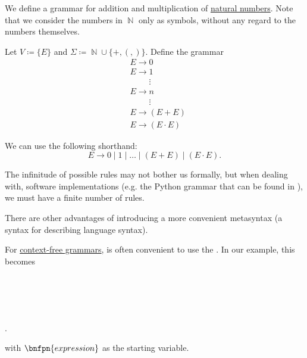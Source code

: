 \begin{example}\label{ex:natural_arithmetic_grammar/backus_naur_form}
  We define a grammar for addition and multiplication of \hyperref[def:set_of_natural_numbers]{natural numbers}. Note that we consider the numbers in \( \BbbN \) only as symbols, without any regard to the numbers themselves.

  Let \( V \coloneqq \{ E \} \) and \( \Sigma \coloneqq \BbbN \cup \{ +, (, ) \} \). Define the grammar
  \begin{equation}\label{eq:ex:natural_arithmetic_grammar/backus_naur_form/simple}
    \begin{aligned}
      &E \to 0 \\
      &E \to 1 \\
      &\phantom{E \to} \vdots \\
      &E \to n \\
      &\phantom{E \to} \vdots \\
      &E \to (E + E) \\
      &E \to (E \cdot E)
    \end{aligned}
  \end{equation}

  We can use the following shorthand:
  \begin{equation}\label{eq:ex:natural_arithmetic_grammar/backus_naur_form/shorthand}
    E \to 0 \mid 1 \mid \ldots \mid (E + E) \mid (E \cdot E).
  \end{equation}

  The infinitude of possible rules may not bother us formally, but when dealing with, software implementations (e.g. the Python grammar that can be found in \cite{Python39Grammar}), we must have a finite number of rules.

  There are other advantages of introducing a more convenient metasyntax (a syntax for describing language syntax).

  For \hyperref[def:grammar/context_free]{context-free grammars}, is often convenient to use the . In our example, this becomes
  \begin{bnf*}
     { \bnfor {} \bnfor {} \bnfor {} \bnfor {} \bnfor {} \bnfor {} \bnfor {} \bnfor {}} \\
             { \bnfor {}} \\
            { \bnfor {} \bnfsp {}} \\
         {\bnfts{+} \bnfor \bnfts{\( \cdot \)}} \\
        { \bnfor \bnfts{(} \bnfsp {} \bnfsp {} \bnfsp {} \bnfsp \bnfts{)}}.
  \end{bnf*}
  with \( \bnfpn{expression} \) as the starting variable.


\end{example}
